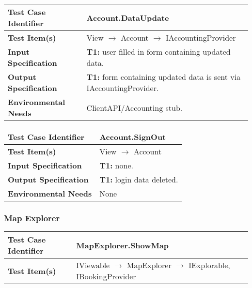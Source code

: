 {\noindent
\begin{tabularx}{\textwidth}{l X}
    \hline 
    \textbf{Test Case Identifier} & Account.DataUpdate\\ 
    \hline 
    
    \textbf{Test Item(s)} & View $\rightarrow$ Account $\rightarrow$ IAccountingProvider\\
    \hline 
    
    \textbf{Input Specification}  & \textbf{T1:} user filled in form containing updated data.\\
    \hline 
    
    \textbf{Output Specification} & \textbf{T1:} form containing updated data is sent via IAccountingProvider.\\
    \hline 
    
    \textbf{Environmental Needs} & ClientAPI/Accounting stub.\\
    \hline
\end{tabularx}
\bigskip 

\noindent
\begin{tabularx}{\textwidth}{l X}
    \hline 
    \textbf{Test Case Identifier} & Account.SignOut\\ 
    \hline 
    
    \textbf{Test Item(s)} & View $\rightarrow$ Account\\
    \hline 
    
    \textbf{Input Specification}  & \textbf{T1:} none.\\
    \hline 
    
    \textbf{Output Specification} & \textbf{T1:} login data deleted.\\
    \hline 
    
    \textbf{Environmental Needs} & None\\
    \hline
\end{tabularx}


\subsubsection{Map Explorer}
\noindent
\begin{tabularx}{\textwidth}{l X}
    \hline 
    \textbf{Test Case Identifier} & MapExplorer.ShowMap\\ 
    \hline 
    
    \textbf{Test Item(s)} & IViewable $\rightarrow$ MapExplorer $\rightarrow$ IExplorable, IBookingProvider\\
    \hline 
    

\end{tabularx}}
